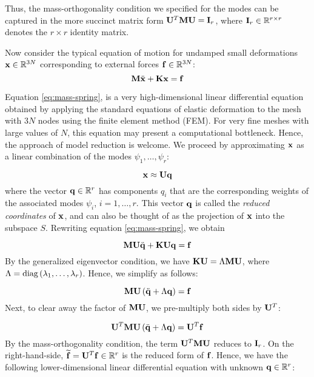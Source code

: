 {Thus, the mass-orthogonality condition we specified for the modes can be captured in the more succinct matrix form $\mathbf{U}^{T} \mathbf{M} \mathbf{U} = \mathbf{I}_r$,
where $\mathbf{I}_r \in \mathbb{R}^{r \times r}$ denotes the $r \times r$ identity matrix.

Now consider the typical equation of motion for undamped small deformations $\mathbf{x} \in \mathbb{R}^{3N}$ corresponding to external forces $\mathbf{f} \in \mathbb{R}^{3N}$: 
\begin{equation}
\label{eq:mass-spring}
\mathbf{M} \ddot{\mathbf{x}} + \mathbf{K} \mathbf{x} = \mathbf{f}
\end{equation}

Equation \ref{eq:mass-spring}, is a very high-dimensional linear differential equation obtained by applying the standard equations of elastic deformation to the mesh with $3N$ nodes using the finite element method (FEM). For very fine meshes with large values of $N$, this equation may present a computational bottleneck. Hence, the approach of model reduction is welcome. We proceed by approximating $\mathbf{x}$ as a linear combination of the modes $\psi_1, \dots, \psi_r$:

\begin{equation}
\mathbf{x} \approx \mathbf{U} \mathbf{q}
\end{equation}
where the vector $\mathbf{q} \in \mathbb{R}^{r}$ has components $q_i$ that are the corresponding weights of the associated modes $\psi_i$, $i=1,\dots,r$. This vector $\mathbf{q}$ is called the {\em reduced coordinates} of $\mathbf{x}$, and can also be thought of as the projection of $\mathbf{x}$ into the subspace $S$. Rewriting equation \ref{eq:mass-spring}, we obtain

\begin{equation}
\mathbf{M} {\mathbf{U} \ddot{\mathbf{q}}} + \mathbf{K} \mathbf{U} \mathbf{q} = \mathbf{f}
\end{equation}
By the generalized eigenvector condition, we have $\mathbf{K} \mathbf{U} = \Lambda \mathbf{M} \mathbf{U}$, where $\Lambda = \textnormal{diag}\left(\lambda_1, \dots, \lambda_r\right)$. Hence, we simplify as follows:

\begin{equation}
\mathbf{M} \mathbf{U} \left(\ddot{\mathbf{q}} + \Lambda \mathbf{q}\right) = \mathbf{f}
\end{equation}
Next, to clear away the factor of $\mathbf{M} \mathbf{U}$, we pre-multiply both sides by $\mathbf{U}^{T}$:

\begin{equation}
\mathbf{U}^{T} \mathbf{M} \mathbf{U} \left(\ddot{\mathbf{q}} + \Lambda \mathbf{q}\right)= \mathbf{U}^{T} \mathbf{f}
\end{equation}
By the mass-orthogonality condition, the term $\mathbf{U}^{T} \mathbf{M} \mathbf{U}$ reduces to $\mathbf{I}_r$.  On the right-hand-side, $\widetilde{\mathbf{f}} = \mathbf{U}^{T} \mathbf{f} \in \mathbb{R}^r$ is the reduced form of $\mathbf{f}$. Hence, we have the following lower-dimensional linear differential equation with unknown $\mathbf{q} \in \mathbb{R}^{r}$:

}
